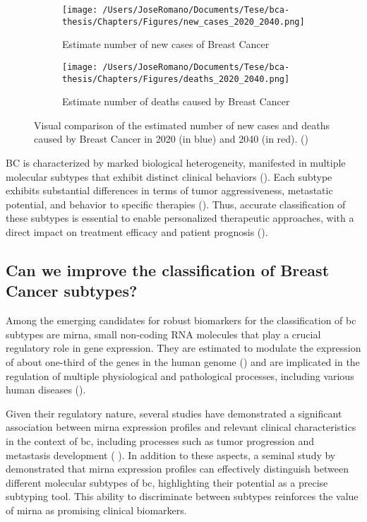 \begin{figure}[h!]
  \centering
  \begin{subfigure}[b]{0.45\textwidth}
    \centering
    \texttt{[image: /Users/JoseRomano/Documents/Tese/bca-thesis/Chapters/Figures/new\_cases\_2020\_2040.png]}
    \caption{Estimate number of new cases of Breast Cancer}
    \label{fig:new_cases_2020_2040}
  \end{subfigure}
  \vspace{0.5cm}
  \begin{subfigure}[b]{0.45\textwidth}
    \centering
    \texttt{[image: /Users/JoseRomano/Documents/Tese/bca-thesis/Chapters/Figures/deaths\_2020\_2040.png]}
    \caption{Estimate number of deaths caused by Breast Cancer}
    \label{fig:deaths_2020_2040}
  \end{subfigure}
  \caption{Visual comparison of the estimated number of new cases and deaths caused by Breast Cancer 
    in 2020 (in blue) and 2040 (in red). (\textcites{GLOBOCAN2022})}
  \label{fig:estimates_2020_2040}
\end{figure}

BC is characterized by marked biological heterogeneity, manifested in multiple
molecular subtypes that exhibit distinct clinical behaviors
(\textcite{bc_molecular_Perou2000}). Each subtype exhibits substantial
differences in terms of tumor aggressiveness, metastatic potential, and
behavior to specific therapies (\textcite{bc_subtypes_Prat2015Clinical}). Thus,
accurate classification of these subtypes is essential to enable personalized
therapeutic approaches, with a direct impact on treatment efficacy and patient
prognosis (\textcite{need_for_subtype_treatments_Testa2020Breast}).

\subsection{Can we improve the classification of Breast Cancer subtypes?}
Among the emerging candidates for robust biomarkers for the classification of
\gls{bc} subtypes are \gls{mirna}, small non-coding RNA molecules that play a
crucial regulatory role in gene expression. They are estimated to modulate the
expression of about one-third of the genes in the human genome
(\textcite{mirna_importance_Hammond2015An}) and are implicated in the regulation
of multiple physiological and pathological processes, including various human
diseases (\textcite{mirna_as_biomarkers_Ho2022}).

Given their regulatory nature, several studies have demonstrated a significant
association between \gls{mirna} expression profiles and relevant clinical
characteristics in the context of \gls{bc}, including processes such as tumor
progression and metastasis development (\textcite{mirna_as_biomarkers_Ho2022}
\textcite{mirnas_in_bc_Muñoz2023}). In addition to these aspects, a seminal
study by \textcite{mirna_as_bio_for_sub_Blenkiron2007MicroRNA} demonstrated
that \gls{mirna} expression profiles can effectively distinguish between
different molecular subtypes of \gls{bc}, highlighting their potential as a
precise subtyping tool. This ability to discriminate between subtypes
reinforces the value of \gls{mirna} as promising clinical biomarkers.


